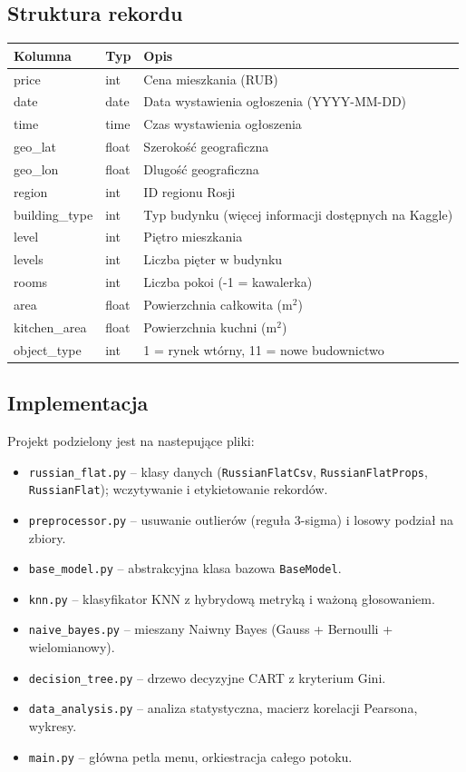 \documentclass[12pt,a4paper]{article}
\begin{document}
	\subsection{Struktura rekordu}
	\begin{center}
	\begin{tabular}{|l|l|l|}
		\hline
		\textbf{Kolumna} & \textbf{Typ} & \textbf{Opis} \\
		\hline
		price & int & Cena mieszkania (RUB) \\
		date & date & Data wystawienia ogłoszenia (YYYY-MM-DD) \\
		time & time & Czas wystawienia ogłoszenia \\
		geo\_lat & float & Szerokość geograficzna \\
		geo\_lon & float & Dlugość geograficzna \\
		region & int & ID regionu Rosji \\
		building\_type & int & Typ budynku (więcej informacji dostępnych na Kaggle) \\
		level & int & Piętro mieszkania \\
		levels & int & Liczba pięter w budynku \\
		rooms & int & Liczba pokoi (-1 = kawalerka) \\
		area & float & Powierzchnia całkowita (m$^2$) \\
		kitchen\_area & float & Powierzchnia kuchni (m$^2$) \\
		object\_type & int & 1 = rynek wtórny, 11 = nowe budownictwo \\
		\hline
	\end{tabular}
	\end{center}

	\newpage
	\subsection{Implementacja}
	Projekt podzielony jest na nastepujące pliki:
	\begin{itemize}
		\item \texttt{russian\_flat.py} -- klasy danych (\texttt{RussianFlatCsv}, \texttt{RussianFlatProps}, \texttt{RussianFlat}); wczytywanie i etykietowanie rekordów.
		\item \texttt{preprocessor.py} -- usuwanie outlierów (reguła 3-sigma) i losowy podział na zbiory.
		\item \texttt{base\_model.py} -- abstrakcyjna klasa bazowa \texttt{BaseModel}.
		\item \texttt{knn.py} -- klasyfikator KNN z hybrydową metryką i ważoną głosowaniem.
		\item \texttt{naive\_bayes.py} -- mieszany Naiwny Bayes (Gauss + Bernoulli + wielomianowy).
		\item \texttt{decision\_tree.py} -- drzewo decyzyjne CART z kryterium Gini.
		\item \texttt{data\_analysis.py} -- analiza statystyczna, macierz korelacji Pearsona, wykresy.
		\item \texttt{main.py} -- główna petla menu, orkiestracja całego potoku.
	\end{itemize}
	
\end{document}
